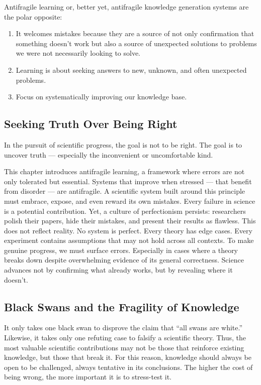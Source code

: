 Antifragile learning or, better yet, antifragile knowledge generation systems are the polar opposite:
\begin{enumerate}
	\item It welcomes mistakes because they are a source of not only confirmation that something doesn't work but also a source of unexpected solutions to problems we were not necessarily looking to solve.
	\item Learning is about seeking answers to new, unknown, and often unexpected problems.
	\item Focus on systematically improving our knowledge base.
\end{enumerate}


\subsection{Seeking Truth Over Being Right}

In the pursuit of scientific progress, the goal is not to be right. The goal is to uncover truth — especially the inconvenient or uncomfortable kind.

This chapter introduces antifragile learning, a framework where errors are not only tolerated but essential. Systems that improve when stressed — that benefit from disorder — are antifragile. A scientific system built around this principle must embrace, expose, and even reward its own mistakes. Every failure in science is a potential contribution. Yet, a culture of perfectionism persists: researchers polish their papers, hide their mistakes, and present their results as flawless. This does not reflect reality. No system is perfect. Every theory has edge cases. Every experiment contains assumptions that may not hold across all contexts. To make genuine progress, we must surface errors. Especially in cases where a theory breaks down despite overwhelming evidence of its general correctness. Science advances not by confirming what already works, but by revealing where it doesn't.



\subsection{Black Swans and the Fragility of Knowledge}

It only takes one black swan to disprove the claim that “all swans are white.” Likewise, it takes only one refuting case to falsify a scientific theory. Thus, the most valuable scientific contributions may not be those that reinforce existing knowledge, but those that break it. For this reason, knowledge should always be open to be challenged, always tentative in its conclusions. The higher the cost of being wrong, the more important it is to stress-test it.

